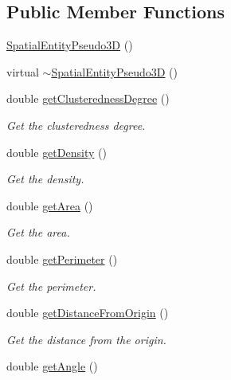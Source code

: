 \subsection*{Public Member Functions}
\begin{DoxyCompactItemize}
\item 
\hyperlink{classmultiscale_1_1analysis_1_1SpatialEntityPseudo3D_aa391fae1e086502392a2c89dcea27022}{Spatial\-Entity\-Pseudo3\-D} ()
\item 
virtual \hyperlink{classmultiscale_1_1analysis_1_1SpatialEntityPseudo3D_a5d44f1cc668d9ef8b1bb5ba573a08c93}{$\sim$\-Spatial\-Entity\-Pseudo3\-D} ()
\item 
double \hyperlink{classmultiscale_1_1analysis_1_1SpatialEntityPseudo3D_a532020267c8ffd4375e2d204debf8454}{get\-Clusteredness\-Degree} ()
\begin{DoxyCompactList}\small\item\em Get the clusteredness degree. \end{DoxyCompactList}\item 
double \hyperlink{classmultiscale_1_1analysis_1_1SpatialEntityPseudo3D_a98a29584b604d113db53e7009fd3cb79}{get\-Density} ()
\begin{DoxyCompactList}\small\item\em Get the density. \end{DoxyCompactList}\item 
double \hyperlink{classmultiscale_1_1analysis_1_1SpatialEntityPseudo3D_ae85647e35a4cbb3ed193d039cf0395a9}{get\-Area} ()
\begin{DoxyCompactList}\small\item\em Get the area. \end{DoxyCompactList}\item 
double \hyperlink{classmultiscale_1_1analysis_1_1SpatialEntityPseudo3D_a455bf65abb87bd8b65d0cbe2234e4491}{get\-Perimeter} ()
\begin{DoxyCompactList}\small\item\em Get the perimeter. \end{DoxyCompactList}\item 
double \hyperlink{classmultiscale_1_1analysis_1_1SpatialEntityPseudo3D_a26530af3d05b0257386ce02498a5a84b}{get\-Distance\-From\-Origin} ()
\begin{DoxyCompactList}\small\item\em Get the distance from the origin. \end{DoxyCompactList}\item 
double \hyperlink{classmultiscale_1_1analysis_1_1SpatialEntityPseudo3D_a9f3394cfe46d66ae9c13d805ad460cb5}{get\-Angle} ()

\end{DoxyCompactItemize}
